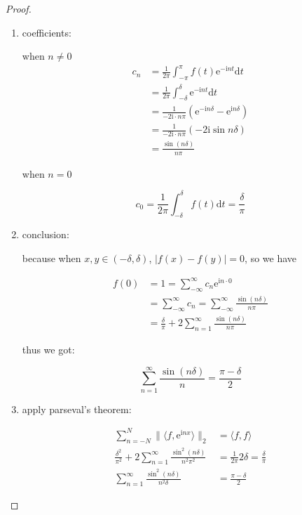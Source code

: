 \begin{proof}
    \begin{enumerate}
        \item coefficients:

    when $n \ne 0$
    \begin{align*}
        c_n &= \frac{1}{2\pi}\int_{-\pi}^{\pi} f(t) \mathrm{e}^{-\mathrm{i}nt} \mathrm{d}t \\
        &= \frac{1}{2\pi}\int_{-\delta}^{\delta}  \mathrm{e}^{-\mathrm{i}nt} \mathrm{d}t \\
        &= \frac{1}{-2\mathrm{i}\cdot n\pi}\left(\mathrm{e}^{- \mathrm{i}n \delta} - \mathrm{e}^{\mathrm{i}n \delta} \right) \\
        &= \frac{1}{-2\mathrm{i}\cdot n\pi}\left( -2 \mathrm{i} \sin n \delta \right) \\
        &= \frac{\sin (n \delta)}{ n\pi}
    \end{align*} 

    when $n = 0$

    \[
        c_0 = \frac{1}{2\pi}\int_{-\delta}^{\delta} f(t)  \mathrm{d}t = \frac{\delta}{\pi}
    \]

        \item conclusion:

        because when $x,y \in (-\delta, \delta)$, $|f(x) - f(y) | = 0$, so we have
        
        \begin{align*}
            f(0) &= 1 = \sum_{-\infty}^{\infty}c_n \mathrm{e}^{\mathrm{i} n \cdot 0} \\
            &= \sum_{-\infty}^{\infty}c_n = \sum_{-\infty}^{\infty}\frac{\sin (n \delta)}{ n\pi} \\
            &= \frac{\delta}{\pi} + 2\sum_{n=1}^{\infty} \frac{\sin (n \delta)}{n \pi}
        \end{align*}

        thus we got:

        \[
\sum_{n=1}^{\infty} \frac{\sin (n \delta)}{n} =  \frac{\pi - \delta}{2}
        \]

        \item apply parseval's theorem:
        
        \begin{align*}
            \sum_{n=-N}^{N} \|\langle f, \mathrm{e}^{\mathrm{i}nx} \rangle\|_2 &= \langle f,f \rangle \\
            \frac{\delta^2}{\pi^2} + 2\sum_{n=1}^{\infty} \frac{\sin^2 (n \delta)}{n^2 \pi^2} &= \frac{1}{2\pi} 2\delta = \frac{\delta}{\pi} \\
\sum_{n=1}^{\infty} \frac{\sin^2 (n \delta)}{n^2 \delta} &= \frac{\pi - \delta}{2}
        \end{align*}
    \end{enumerate}
\end{proof}


